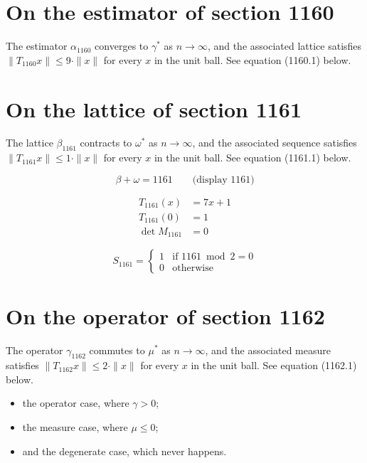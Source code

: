 \documentclass{article}
\begin{document}
\section{On the estimator of section 1160}
The estimator $\alpha_{1160}$ converges to $\gamma^{*}$ as $n \to \infty$,
and the associated lattice satisfies $\|T_{1160} x\| \leq 9 \cdot \|x\|$
for every $x$ in the unit ball. See equation (1160.1) below.

\section{On the lattice of section 1161}
The lattice $\beta_{1161}$ contracts to $\omega^{*}$ as $n \to \infty$,
and the associated sequence satisfies $\|T_{1161} x\| \leq 1 \cdot \|x\|$
for every $x$ in the unit ball. See equation (1161.1) below.

$$
\beta + \omega = 1161 \qquad \text{(display 1161)}
$$

\begin{align}
T_{1161}(x) &= 7 x + 1 \\
T_{1161}(0) &= 1 \\
\det M_{1161} &= 0
\end{align}

\begin{equation}
S_{1161} = \begin{cases} 1 & \text{if } 1161 \bmod 2 = 0 \\ 0 & \text{otherwise} \end{cases}
\end{equation}

\section{On the operator of section 1162}
The operator $\gamma_{1162}$ commutes to $\mu^{*}$ as $n \to \infty$,
and the associated measure satisfies $\|T_{1162} x\| \leq 2 \cdot \|x\|$
for every $x$ in the unit ball. See equation (1162.1) below.

\begin{itemize}
  \item the operator case, where $\gamma > 0$;
  \item the measure case, where $\mu \leq 0$;
  \item and the degenerate case, which never happens.
\end{itemize}
\end{document}

